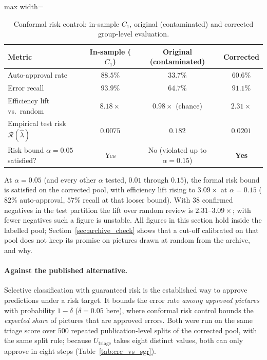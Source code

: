 \documentclass[12pt,a4paper]{report}
\begin{document}
\begin{table}[!htbp]
\centering
\caption[Conformal risk control: in-sample, contaminated and corrected pools]{Conformal risk control: in-sample $C_1$, original (contaminated) and corrected group-level evaluation.}
\label{tab:crc_clean_vs_leaky}
\begin{adjustbox}{max width=\linewidth}
\begin{tabular}{lccc}
\toprule
\textbf{Metric} & \textbf{In-sample ($C_1$)} & \textbf{Original (contaminated)} & \textbf{Corrected} \\
\midrule
Auto-approval rate & $88.5\%$ & $33.7\%$ & $60.6\%$ \\
Error recall & $93.9\%$ & $64.7\%$ & $91.1\%$ \\
Efficiency lift vs.\ random & $8.18\times$ & $0.98\times$ (chance) & $\mathbf{2.31\times}$ \\
Empirical test risk $\mathcal{R}(\hat\lambda)$ & $0.0075$ & $0.182$ & $\mathbf{0.0201}$ \\
Risk bound $\alpha=0.05$ satisfied? & Yes & No (violated up to $\alpha=0.15$) & \textbf{Yes} \\
\bottomrule
\end{tabular}
\end{adjustbox}
\end{table}

At $\alpha=0.05$ (and every other $\alpha$ tested, $0.01$ through $0.15$), the formal risk bound is satisfied on the corrected pool, with efficiency lift rising to $3.09\times$ at $\alpha=0.15$ ($82\%$ auto-approval, $57\%$ recall at that looser bound). With $38$ confirmed negatives in the test partition the lift over random review is $2.31$--$3.09\times$; with fewer negatives such a figure is unstable. All figures in this section hold inside the labelled pool; Section~\ref{sec:archive_check} shows that a cut-off calibrated on that pool does not keep its promise on pictures drawn at random from the archive, and why.

\paragraph{Against the published alternative.} Selective classification with guaranteed risk \cite{geifman2017selective} is the established way to approve predictions under a risk target. It bounds the error rate \emph{among approved pictures} with probability $1-\delta$ ($\delta=0.05$ here), where conformal risk control bounds the \emph{expected share} of pictures that are approved errors. Both were run on the same triage score over $500$ repeated publication-level splits of the corrected pool, with the same split rule; because $U_{\text{triage}}$ takes eight distinct values, both can only approve in eight steps (Table~\ref{tab:crc_vs_sgr}).
\end{document}
